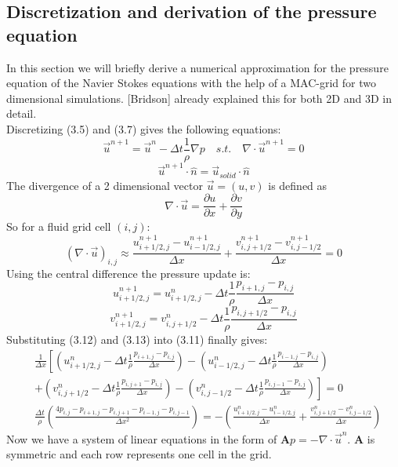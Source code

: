 \subsection{Discretization and derivation of the pressure equation}
In this section we will briefly derive a numerical approximation for the pressure equation of the Navier Stokes equations with the help of a MAC-grid for two dimensional simulations. [Bridson] already explained this for both 2D and 3D in detail.\\
Discretizing (3.5) and (3.7) gives the following equations:
\begin{equation} \label{navier-stokes12}
	\vec{u}^{n+1} = \vec{u}^{n} - \Delta t \frac{1}{\rho} \nabla p \quad s.t. \quad \nabla \cdot \vec{u}^{n+1} = 0
\end{equation}
\begin{equation} \label{navier-stokes12}
	\vec{u}^{n+1} \cdot \hat{n} = \vec{u}_{solid} \cdot \hat{n}
\end{equation}
The divergence of a 2 dimensional vector $\vec{u} = (u, v)$ is defined as
\begin{equation} \label{navier-stokes12}
	\nabla \cdot \vec{u} = \frac{\partial u}{\partial x} + \frac{\partial v}{\partial y}
\end{equation}
So for a fluid grid cell $(i, j)$:
\begin{equation} \label{navier-stokes12}
	(\nabla \cdot \vec{u})_{i,j} \approx \frac{u_{i+1/2,j}^{n+1} - u_{i-1/2,j}^{n+1}}{\Delta x} + \frac{v_{i,j+1/2}^{n+1} - v_{i,j-1/2}^{n+1}}{\Delta x} = 0
\end{equation}
Using the central difference the pressure update is:
\begin{equation} \label{navier-stokes12}
	u_{i+1/2,j}^{n+1} = u_{i+1/2,j}^{n} - \Delta t \frac{1}{\rho} \frac{p_{i+1,j} - p_{i,j}}{\Delta x}
\end{equation}
\begin{equation} \label{navier-stokes12}
v_{i+1/2,j}^{n+1} = v_{i,j+1/2}^{n} - \Delta t \frac{1}{\rho} \frac{p_{i,j+1/2} - p_{i,j}}{\Delta x}
\end{equation}
Substituting (3.12) and (3.13) into (3.11) finally gives:
\begin{equation}
	\begin{aligned}
		& \frac{1}{\Delta x}\left[\left(u_{i+1/2,j}^{n} - \Delta t \frac{1}{\rho} \frac{p_{i+1,j} - p_{i,j}}{\Delta x}\right) - \left(u_{i-1/2,j}^{n} - \Delta t \frac{1}{\rho} \frac{p_{i-1,j} - p_{i,j}}{\Delta x}\right) \right. \\
		& + \left. \left(v_{i,j+1/2}^{n} - \Delta t \frac{1}{\rho} \frac{p_{i,j+1} - p_{i,j}}{\Delta x}\right) - \left(v_{i,j-1/2}^{n} - \Delta t \frac{1}{\rho} \frac{p_{i,j-1} - p_{i,j}}{\Delta x} \right) \right] = 0 \\
		& \frac{\Delta t}{\rho} \left( \frac{4p_{i,j} - p_{i+1,j} - p_{i,j+1} - p_{i-1,j} - p_{i,j-1}}{\Delta x^2} \right) = - \left( \frac{u_{i+1/2,j}^{n} - u_{i-1/2,j}^{n}}{\Delta x} + \frac{v_{i,j+1/2}^{n} - v_{i,j-1/2}^{n}}{\Delta x} \right)
\end{aligned}
\end{equation}
Now we have a system of linear equations in the form of $\mathbf{A}p = -\nabla \cdot \vec{u}^n$. $\mathbf{A}$ is symmetric and each row represents one cell in the grid. 


